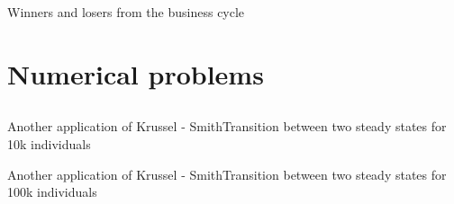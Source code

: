 \documentclass{beamer}
\begin{document}
\begin{frame}{Winners and losers from the business cycle}
\end{frame}

\section{Numerical problems}
\subsection{}
\begin{frame}{Another application of Krussel - Smith}{Transition between two steady states for 10k individuals}
\end{frame}

\begin{frame}{Another application of Krussel - Smith}{Transition between two steady states for 100k individuals}
\end{frame}
\end{document}
